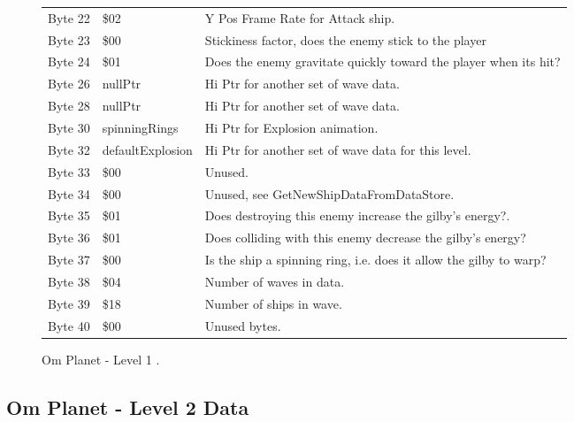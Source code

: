\begin{figure}[H]
{\begin{adjustbox}{width=12cm}
\begin{tabular}{lll}
 Byte 22 & \$02                       & Y Pos Frame Rate for Attack ship.                                  \\
 Byte 23 & \$00                       & Stickiness factor, does the enemy stick to the player              \\
 Byte 24 & \$01                       & Does the enemy gravitate quickly toward the player when its hit?   \\
 Byte 26 & nullPtr                   & Hi Ptr for another set of wave data.                               \\
 Byte 28 & nullPtr                   & Hi Ptr for another set of wave data.                               \\
 Byte 30 & spinningRings             & Hi Ptr for Explosion animation.                                    \\
 Byte 32 & defaultExplosion          & Hi Ptr for another set of wave data for this level.                \\
 Byte 33 & \$00                       & Unused.                                                            \\
 Byte 34 & \$00                       & Unused, see GetNewShipDataFromDataStore.                           \\
 Byte 35 & \$01                       & Does destroying this enemy increase the gilby's energy?.           \\
 Byte 36 & \$01                       & Does colliding with this enemy decrease the gilby's energy?        \\
 Byte 37 & \$00                       & Is the ship a spinning ring, i.e. does it allow the gilby to warp? \\
 Byte 38 & \$04                       & Number of waves in data.                                           \\
 Byte 39 & \$18                       & Number of ships in wave.                                           \\
 Byte 40 & \$00                       & Unused bytes.                                                      \\
\bottomrule
\end{tabular}

  \end{adjustbox}

  }\caption*{Om Planet - Level 1
.}
\end{figure}

\clearpage
\subsection{Om Planet - Level 2 Data}

